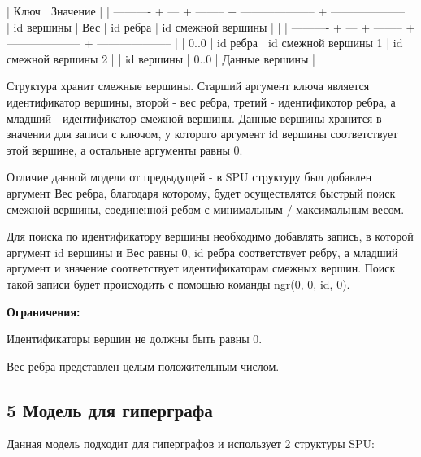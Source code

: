 \begin{DoxyCode}
| Ключ                                               | Значение             |
| ---------- + --- + -------- + -------------------- + -------------------- |
| id вершины | Вес | id ребра | id смежной вершины   |                      |
| ---------- + --- + -------- + -------------------- + -------------------- |
| 0..0             | id ребра | id смежной вершины 1 | id смежной вершины 2 | 
| id вершины | 0..0                                  | Данные вершины       | 
\end{DoxyCode}


Структура хранит смежные вершины. Старший аргумент ключа является идентификатор вершины, второй -\/ вес ребра, третий -\/ идентификотор ребра, а младший -\/ идентификатор смежной вершины. Данные вершины хранится в значении для записи с ключом, у которого аргумент {\ttfamily id вершины} соответствует этой вершине, а остальные аргументы равны 0.

Отличие данной модели от предыдущей -\/ в S\+PU структуру был добавлен аргумент {\ttfamily Вес ребра}, благодаря которому, будет осуществлятся быстрый поиск смежной вершины, соединенной ребом с минимальным / максимальным весом.

Для поиска по идентификатору вершины необходимо добавлять запись, в которой аргумент {\ttfamily id вершины} и {\ttfamily Вес} равны 0, {\ttfamily id ребра} соответствует ребру, а младший аргумент и значение соответствует идентификаторам смежных вершин. Поиск такой записи будет происходить с помощью команды {\ttfamily ngr(0, 0, id, 0)}.

{\bfseries Ограничения\+:}
\begin{DoxyEnumerate}
\item Идентификаторы вершин не должны быть равны 0.
\item Вес ребра представлен целым положительным числом.
\end{DoxyEnumerate}\hypertarget{md_docs__xD0_x93_xD1_x80_xD0_xB0_xD1_x84_xD0_xBE_xD0_xB2_xD1_x8B_xD0_xB5__xD0_xBC_xD0_xBE_xD0_xB4_xD0_xB5_xD0_xBB_xD0_xB8_autotoc_md8}{}\subsection{5 Модель для гиперграфа}\label{md_docs__xD0_x93_xD1_x80_xD0_xB0_xD1_x84_xD0_xBE_xD0_xB2_xD1_x8B_xD0_xB5__xD0_xBC_xD0_xBE_xD0_xB4_xD0_xB5_xD0_xBB_xD0_xB8_autotoc_md8}
Данная модель подходит для гиперграфов и использует 2 структуры S\+PU\+:


